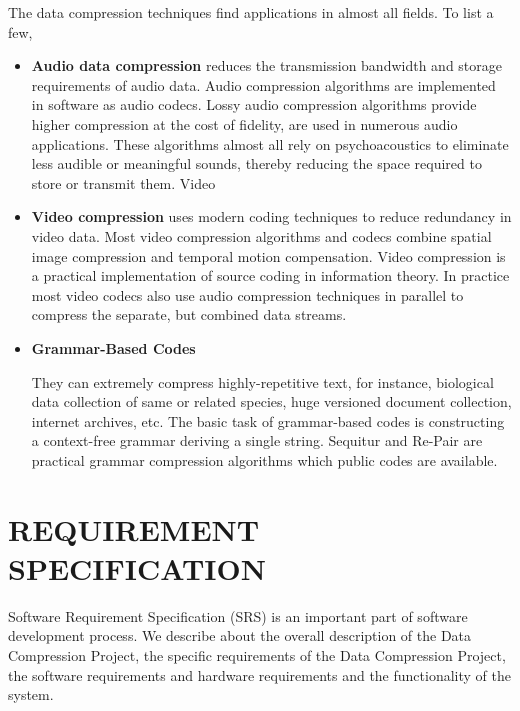 \documentclass[12pt]{report}
\begin{document}
The data compression techniques find applications in almost all fields. To list a few,
\begin{itemize}


\item{\textbf{Audio data compression}} reduces the transmission bandwidth and storage requirements of audio data. Audio compression algorithms are implemented in software as audio codecs. Lossy audio compression algorithms provide higher compression at the cost of fidelity, are used in numerous audio applications. These algorithms almost all rely on psychoacoustics to eliminate less audible or meaningful sounds, thereby reducing the space required to store or transmit them.
Video

\item{\textbf{Video compression}} uses modern coding techniques to reduce redundancy in video data. Most video compression algorithms and codecs combine spatial image compression and temporal motion compensation. Video compression is a practical implementation of source coding in information theory. In practice most video codecs also use audio compression techniques in parallel to compress the separate, but combined data streams.
\item{\textbf{Grammar-Based Codes}}

They can extremely compress highly-repetitive text, for instance, biological data collection of same or related species, huge versioned document collection, internet archives, etc. The basic task of grammar-based codes is constructing a context-free grammar deriving a single string. Sequitur and Re-Pair are practical grammar compression algorithms which public codes are available.
\end{itemize}


\pagestyle{fancy}
\chead{}
\rfoot{\small{\thepage}}
\renewcommand{\headrulewidth}{0.4pt}
\renewcommand{\footrulewidth}{0.4pt}
\chapter{REQUIREMENT SPECIFICATION}
Software Requirement Specification (SRS) is an important part of software development process. We describe about the overall description of the Data Compression Project, the specific requirements of the Data Compression Project, the software requirements and hardware requirements and the functionality of the system.
\end{document}
